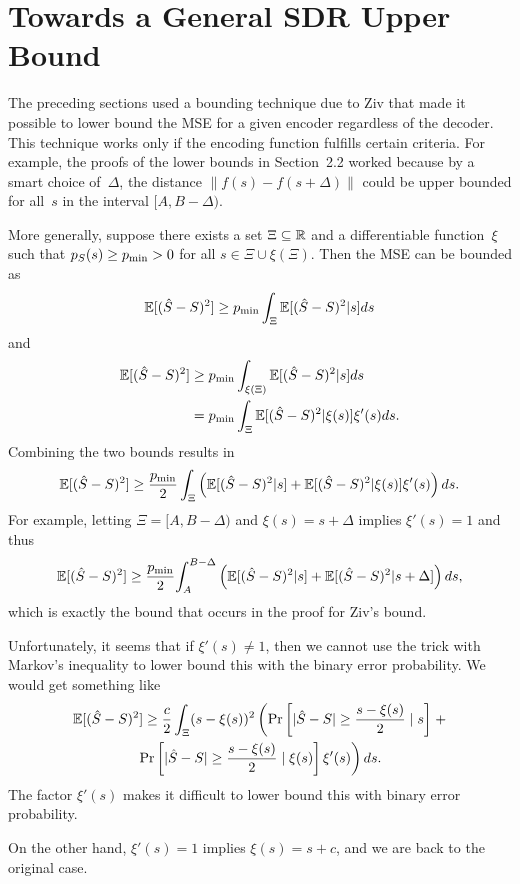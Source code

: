\documentclass[review]{ipgthesis}
\begin{document}
\setcounter{chapter}{1}
\section{Towards a General SDR Upper Bound}\label{sec:gensdrub}

The preceding sections used a bounding technique due to Ziv
that made it possible to lower bound the MSE for a given encoder regardless of
the decoder. This technique works only if the encoding function fulfills certain
criteria. For example, the proofs of the lower bounds in Section~2.2 worked
because by a smart choice of~$\Delta$, the distance $\|f(s) - f(s+\Delta)\|$
could be upper bounded for all~$s$ in the interval $[A,B-\Delta)$.

More generally, suppose there exists a set $\Xi \subseteq \mathbb{R}$ and a
differentiable function~$\xi$ such that ${p_S}(s) \ge {p_{\min}} > 0$ for all $s \in
\Xi \cup \xi(\Xi)$.  Then the MSE can be bounded as
\begin{equation*}
  {\mathbb{E}[({\hat{S}}- S)^2]} \ge {p_{\min}} \int_\Xi {\mathbb{E}[({\hat{S}}- S)^2 | s]} ds
\end{equation*}
and
\begin{align*}
  {\mathbb{E}[({\hat{S}}- S)^2]} &\ge {p_{\min}} \int_{\xi(\Xi)} {\mathbb{E}[({\hat{S}} - S)^2 | s]} ds \\
  &= {p_{\min}} \int_\Xi {\mathbb{E}[({\hat{S}}- S)^2 | \xi(s)]} \xi'(s) ds.
\end{align*}
Combining the two bounds results in
\begin{equation*}
  {\mathbb{E}[({\hat{S}}- S)^2]} \ge \frac{{p_{\min}}}{2} \int_{\Xi} \left( {\mathbb{E}[({\hat{S}} - S)^2 | s]} + {\mathbb{E}[({\hat{S}} - S)^2 | \xi(s)]} \xi'(s)
  \right) ds.
\end{equation*}
For example, letting $\Xi = [A, B-\Delta)$ and $\xi(s) = s + \Delta$ implies
$\xi'(s) = 1$ and thus
\begin{equation*}
  {\mathbb{E}[({\hat{S}}- S)^2]} \ge \frac{{p_{\min}}}{2} {\int_A^{B-\Delta}} \left( {\mathbb{E}[({\hat{S}} - S)^2 | s]} + {\mathbb{E}[({\hat{S}} - S)^2 | s + \Delta]} \right) ds,
\end{equation*}
which is exactly the bound that occurs in the proof for Ziv's bound. 

Unfortunately, it seems that if $\xi'(s) \ne 1$, then we cannot use the trick
with Markov's inequality to lower bound this with the binary error probability.
We would get something like
\begin{multline*}
  {\mathbb{E}[({\hat{S}}- S)^2]} \ge \frac c2 \int_\Xi (s - \xi(s))^2 \left(
  \Pr\left[|{\hat{S}} - S| \ge \frac{s - \xi(s)}{2} \mid s \right] \right. + \\
  \left. \Pr\left[|{\hat{S}} - S| \ge \frac{s - \xi(s)}{2} \mid \xi(s) \right] \xi'(s)
  \right) ds.
\end{multline*}
The factor $\xi'(s)$ makes it difficult to lower bound this with binary error
probability. 

On the other hand, $\xi'(s) = 1$ implies $\xi(s) = s + c$, and we are back to
the original case.
\end{document}
